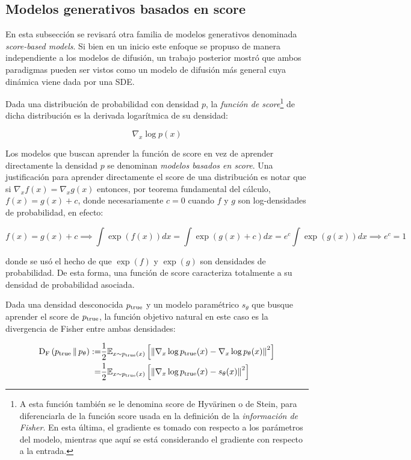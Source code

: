 \subsection{Modelos generativos basados en score}
\label{dm/continuous_dm/score}

En esta subsección se revisará otra familia de modelos generativos denominada \textit{score-based models}. Si bien en un inicio este enfoque se propuso de manera independiente a los modelos de difusión, un trabajo posterior mostró que ambos paradigmas pueden ser vistos como un modelo de difusión más general cuya dinámica viene dada por una SDE.

Dada una distribución de probabilidad con densidad $p$, la \textit{función de score}\footnote{A esta función también se le denomina score de Hyvärinen o de Stein, para diferenciarla de la función score usada en la definición de la \textit{información de Fisher}. En esta última, el gradiente es tomado con respecto a los parámetros del modelo, mientras que aquí se está considerando el gradiente con respecto a la entrada.} de dicha distribución es la derivada logarítmica de su densidad:

\begin{equation}
    \nabla_x \log p(x)
\end{equation}

Los modelos que buscan aprender la función de score en vez de aprender directamente la densidad $p$ se denominan \textit{modelos basados en score}. Una justificación para aprender directamente el score de una distribución es notar que si $\nabla_x f(x) = \nabla_x g(x)$ entonces, por teorema fundamental del cálculo, $f(x) = g(x)+c$, donde necesariamente $c=0$ cuando $f$ y $g$ son log-densidades de probabilidad, en efecto:

\begin{equation}
    f(x) = g(x) + c \implies \int \exp(f(x))dx = \int \exp(g(x) + c)dx = e^c\int \exp(g(x))dx \implies e^c=1
\end{equation}

donde se usó el hecho de que $\exp(f)$ y $\exp(g)$ son densidades de probabilidad. De esta forma, una función de score caracteriza totalmente a su densidad de probabilidad asociada.

Dada una densidad desconocida $p_{\operatorname{true}}$ y un modelo paramétrico $s_\theta$ que busque aprender el score de $p_{\operatorname{true}}$, la función objetivo natural en este caso es la divergencia de Fisher entre ambas densidades:

\begin{align}
    \operatorname{D_F}\left(p_{\operatorname{true}}\,\|\,p_\theta\right) := & \frac{1}{2}\mathbb{E}_{x\sim p_{\operatorname{true}}(x)}\left[\left\lVert \nabla_x\log p_{\operatorname{true}}(x) - \nabla_x\log p_\theta(x) \right\rVert^2\right] \\
    =                        & \frac{1}{2}\mathbb{E}_{x\sim p_{\operatorname{true}}(x)}\left[\left\lVert \nabla_x\log p_{\operatorname{true}}(x) - s_\theta(x) \right\rVert^2\right]
\end{align}

